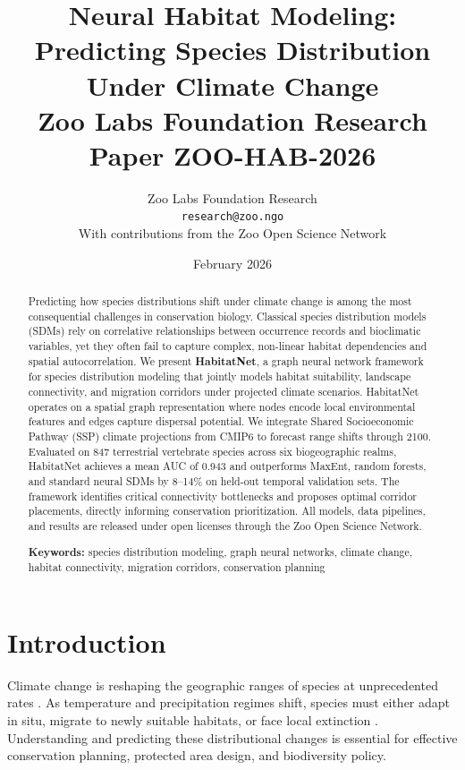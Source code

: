 \documentclass[11pt,a4paper]{article}
\title{%
  \textbf{Neural Habitat Modeling: Predicting Species Distribution\\
  Under Climate Change}\\[0.5em]
  \large Zoo Labs Foundation Research Paper ZOO-HAB-2026
}
\author{
  Zoo Labs Foundation Research\\
  \texttt{research@zoo.ngo}\\[0.5em]
  \small With contributions from the Zoo Open Science Network
}
\date{February 2026}
\begin{document}
\maketitle

\begin{abstract}
\noindent
Predicting how species distributions shift under climate change is among
the most consequential challenges in conservation biology. Classical
species distribution models (SDMs) rely on correlative relationships
between occurrence records and bioclimatic variables, yet they often fail
to capture complex, non-linear habitat dependencies and spatial
autocorrelation. We present \textbf{HabitatNet}, a graph neural network
framework for species distribution modeling that jointly models habitat
suitability, landscape connectivity, and migration corridors under
projected climate scenarios. HabitatNet operates on a spatial graph
representation where nodes encode local environmental features and edges
capture dispersal potential. We integrate Shared Socioeconomic Pathway
(SSP) climate projections from CMIP6 to forecast range shifts through
2100. Evaluated on 847 terrestrial vertebrate species across six
biogeographic realms, HabitatNet achieves a mean AUC of 0.943 and
outperforms MaxEnt, random forests, and standard neural SDMs by
8--14\% on held-out temporal validation sets. The framework identifies
critical connectivity bottlenecks and proposes optimal corridor
placements, directly informing conservation prioritization. All models,
data pipelines, and results are released under open licenses through the
Zoo Open Science Network.

\medskip
\noindent\textbf{Keywords:} species distribution modeling, graph neural
networks, climate change, habitat connectivity, migration corridors,
conservation planning
\end{abstract}

\newpage
\tableofcontents
\newpage

\section{Introduction}
\label{sec:introduction}

Climate change is reshaping the geographic ranges of species at
unprecedented rates \citep{chen2011rapid, pecl2017biodiversity}. As
temperature and precipitation regimes shift, species must either adapt in
situ, migrate to newly suitable habitats, or face local extinction
\citep{urban2015accelerating}. Understanding and predicting these
distributional changes is essential for effective conservation planning,
protected area design, and biodiversity policy.
\end{document}
